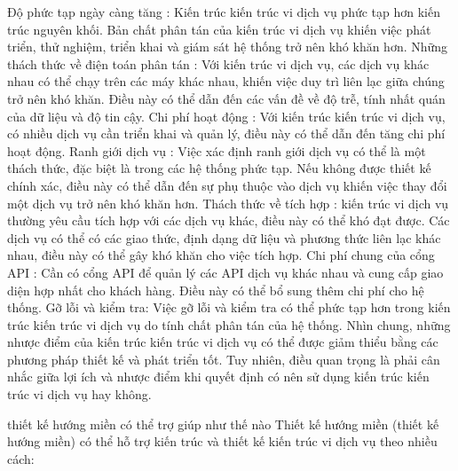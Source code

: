 Độ phức tạp ngày càng tăng : Kiến trúc kiến trúc vi dịch vụ phức tạp hơn kiến trúc nguyên khối. Bản chất phân tán của kiến trúc vi dịch vụ khiến việc phát triển, thử nghiệm, triển khai và giám sát hệ thống trở nên khó khăn hơn.
Những thách thức về điện toán phân tán : Với kiến trúc vi dịch vụ, các dịch vụ khác nhau có thể chạy trên các máy khác nhau, khiến việc duy trì liên lạc giữa chúng trở nên khó khăn. Điều này có thể dẫn đến các vấn đề về độ trễ, tính nhất quán của dữ liệu và độ tin cậy.
Chi phí hoạt động : Với kiến trúc kiến trúc vi dịch vụ, có nhiều dịch vụ cần triển khai và quản lý, điều này có thể dẫn đến tăng chi phí hoạt động.
Ranh giới dịch vụ : Việc xác định ranh giới dịch vụ có thể là một thách thức, đặc biệt là trong các hệ thống phức tạp. Nếu không được thiết kế chính xác, điều này có thể dẫn đến sự phụ thuộc vào dịch vụ khiến việc thay đổi một dịch vụ trở nên khó khăn hơn.
Thách thức về tích hợp : kiến trúc vi dịch vụ thường yêu cầu tích hợp với các dịch vụ khác, điều này có thể khó đạt được. Các dịch vụ có thể có các giao thức, định dạng dữ liệu và phương thức liên lạc khác nhau, điều này có thể gây khó khăn cho việc tích hợp.
Chi phí chung của cổng API : Cần có cổng API để quản lý các API dịch vụ khác nhau và cung cấp giao diện hợp nhất cho khách hàng. Điều này có thể bổ sung thêm chi phí cho hệ thống.
Gỡ lỗi và kiểm tra: Việc gỡ lỗi và kiểm tra có thể phức tạp hơn trong kiến trúc kiến trúc vi dịch vụ do tính chất phân tán của hệ thống.
Nhìn chung, những nhược điểm của kiến trúc kiến trúc vi dịch vụ có thể được giảm thiểu bằng các phương pháp thiết kế và phát triển tốt. Tuy nhiên, điều quan trọng là phải cân nhắc giữa lợi ích và nhược điểm khi quyết định có nên sử dụng kiến trúc kiến trúc vi dịch vụ hay không.

thiết kế hướng miền có thể trợ giúp như thế nào
Thiết kế hướng miền (thiết kế hướng miền) có thể hỗ trợ kiến trúc và thiết kế kiến trúc vi dịch vụ theo nhiều cách:

